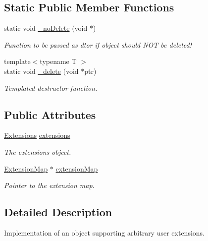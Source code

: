 \subsection*{Static Public Member Functions}
\begin{DoxyCompactItemize}
\item 
static void \hyperlink{class_d_d4hep_1_1_object_extensions_a0c32fb2af89407102b494ab9c15f9eac}{\+\_\+no\+Delete} (void $\ast$)
\begin{DoxyCompactList}\small\item\em Function to be passed as dtor if object should N\+OT be deleted! \end{DoxyCompactList}\item 
{\footnotesize template$<$typename T $>$ }\\static void \hyperlink{class_d_d4hep_1_1_object_extensions_a62415b453a6ea86769c2777c0609eb34}{\+\_\+delete} (void $\ast$ptr)
\begin{DoxyCompactList}\small\item\em Templated destructor function. \end{DoxyCompactList}\end{DoxyCompactItemize}
\subsection*{Public Attributes}
\begin{DoxyCompactItemize}
\item 
\hyperlink{class_d_d4hep_1_1_object_extensions_a882c1e22567a450f60d83eb735dd3532}{Extensions} \hyperlink{class_d_d4hep_1_1_object_extensions_ac96afa01e09dec7a795c88b67c054007}{extensions}
\begin{DoxyCompactList}\small\item\em The extensions object. \end{DoxyCompactList}\item 
\hyperlink{class_d_d4hep_1_1_object_extensions_a22c0e42d5fdc9f3fda39c2c3bec14341}{Extension\+Map} $\ast$ \hyperlink{class_d_d4hep_1_1_object_extensions_a6f517da18e14dc6f4de73a48744e8262}{extension\+Map}
\begin{DoxyCompactList}\small\item\em Pointer to the extension map. \end{DoxyCompactList}\end{DoxyCompactItemize}


\subsection{Detailed Description}
Implementation of an object supporting arbitrary user extensions. 

